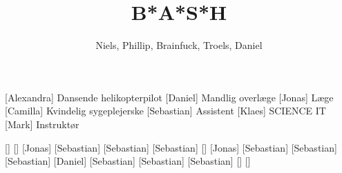 \documentclass[a4paper,11pt]{article}
\title{B*A*S*H}
\author{Niels, Phillip, Brainfuck, Troels, Daniel}
\begin{document}
\maketitle

\begin{roles}
[Alexandra] Dansende helikopterpilot
[Daniel] Mandlig overlæge
[Jonas] Læge
[Camilla] Kvindelig sygeplejerske
[Sebastian] Assistent
[Klaes] SCIENCE IT
[Mark] Instruktør
\end{roles}

\begin{props}
[]
[]
[Jonas]
[Sebastian]
[Sebastian]
[Sebastian]
[]
[Jonas]
[Sebastian]
[Sebastian]
[Sebastian]
[Daniel]
[Sebastian]
[Sebastian]
[Sebastian]
[]
[]
\end{props}
\end{document}
